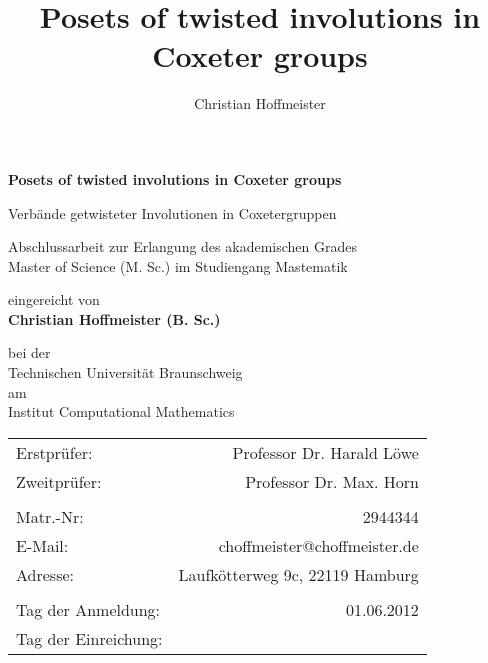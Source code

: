 \title{Posets of twisted involutions in Coxeter groups}
\author{Christian Hoffmeister}

\begin{titlepage}
\begin{center}
{\Large \bf Posets of twisted involutions in Coxeter groups}

{\large Verbände getwisteter Involutionen in Coxetergruppen}

\vspace*{2.5cm}
Abschlussarbeit zur Erlangung des akademischen Grades\\
Master of Science (M. Sc.) im Studiengang Mastematik

\vspace*{2.5cm}
eingereicht von \\
{\Large \bf Christian Hoffmeister (B. Sc.)}

\vspace*{2.5cm}
bei der \\
Technischen Universität Braunschweig \\
am \\
Institut Computational Mathematics

\vfill
\begin{tabular}{lr}
	Erstprüfer: & Professor Dr. Harald Löwe \\
	Zweitprüfer: & Professor Dr. Max. Horn \\
	\vspace*{0.5em} & \\
	Matr.-Nr: & 2944344 \\
	E-Mail: & choffmeister@choffmeister.de \\
	Adresse: & Laufkötterweg 9c, 22119 Hamburg \\
	\vspace*{0.5em} & \\
	Tag der Anmeldung: & 01.06.2012 \\
	Tag der Einreichung: & \\
\end{tabular}
\end{center}
\end{titlepage}